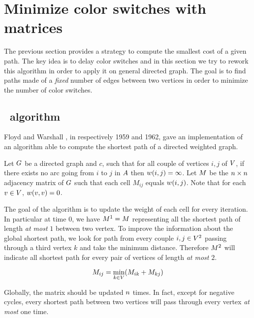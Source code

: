 \section{Minimize color switches with matrices}

The previous section provides a strategy to compute the smallest cost of a given path. The key idea is to delay color switches and in this section we try to rework this algorithm in order to apply it on general directed graph. The goal is to find paths made of a \textit{fixed} number of edges between two vertices in order to minimize the number of color switches.

\subsection{\FW\ algorithm}
\label{sec:fwalgo}

Floyd \cite[]{floyd} and Warshall \cite{warshall}, in respectively 1959 and 1962, gave an implementation \cite[]{floydalgo} of an algorithm able to compute the shortest path of a directed weighted graph.

Let $G$ be a directed graph and $c$, such that for all couple of vertices $i,j$ of $V$, if there exists no arc going from $i$ to $j$ in $A$ then  $w(i,j) = \infty$. Let $M$ be the $n \times n$ adjacency matrix of $G$ such that each cell $M_{ij}$ equals $w(i, j)$. Note that for each $v \in V$, $w(v, v) = 0$.

The goal of the algorithm is to update the weight of each cell for every iteration. In particular at time $0$, we have $M^1 = M$ representing all the shortest path of length \textit{at most} $1$ between two vertex. To improve the information about the global shortest path, we look for path from every couple $i, j \in V^2$ passing through a third vertex $k$ and take the minimum distance. Therefore $M^2$ will indicate all shortest path for every pair of vertices of length \textit{at most} $2$.

\begin{equation}
  \label{eq:cellc}
  M_{ij} = \min_{k \in V} (M_{ik} + M_{kj})
\end{equation}

Globally, the matrix should be updated $n$ times. In fact, except for negative cycles, every shortest path between two vertices will pass through every vertex \textit{at most} one time.



